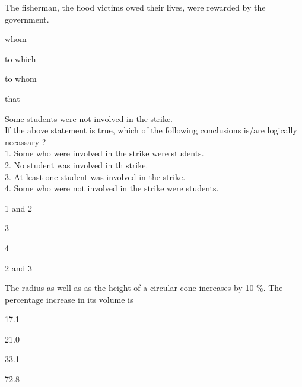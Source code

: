 \iffalse
\title{GATE Questions 15}
\author{EE24BTECH11012 - Bhavanisankar G S}
\section{ph}
\chapter{2019}
\fi
	\item The fisherman, \underline{			} the flood victims owed their lives, were rewarded by the government.
		\begin{enumerate}
		\end{enumerate}
	\item Some students were not involved in the strike. \\
		If the above statement is true, which of the following conclusions is/are logically necassary ? \\
		1. Some who were involved in the strike were students. \\
		2. No student was involved in th strike. \\
		3. At least one student was involved in the strike. \\
		4. Some who were not involved in the strike were students.
		\begin{enumerate}
				\begin{multicols}{2}
				\item 1 and 2
				\item 3
				\item 4
				\item 2 and 3
				\end{multicols}
		\end{enumerate}
	\item The radius as well as as the height of a circular cone increases by 10 \%. The percentage increase in its volume is
		\begin{enumerate}
				\begin{multicols}{4}
				\item 17.1
				\item 21.0
				\item 33.1
				\item 72.8
				\end{multicols}
		\end{enumerate}
